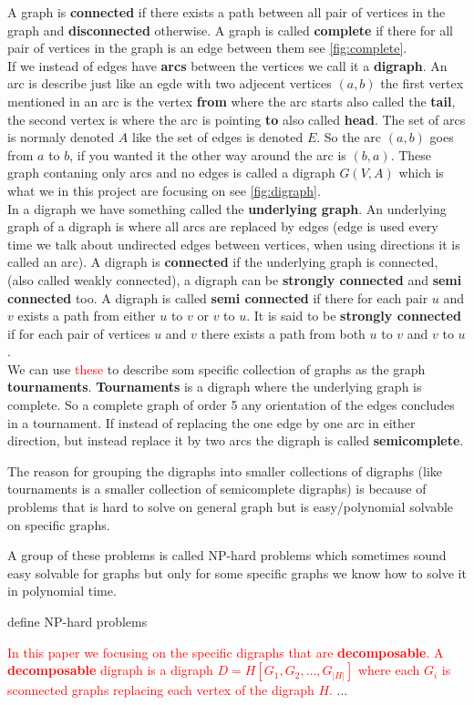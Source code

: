 A graph is \textbf{connected} if there exists a path between all pair of vertices in the graph and \textbf{disconnected} otherwise.
A graph is called \textbf{complete} if there for all pair of vertices in the graph is an edge between them see \autoref{fig:complete}.\\

If we instead of edges have \textbf{arcs} between the vertices we call it a \textbf{digraph}.
An arc is describe just like an egde with two adjecent vertices $(a,b)$ the first vertex mentioned in an arc is the vertex \textbf{from} where the arc starts also called the \textbf{tail}, the second vertex is where the arc is pointing \textbf{to} also called \textbf{head}. The set of arcs is normaly denoted $A$ like the set of edges is denoted $E$. 
So the arc $(a,b)$ goes from $a$ to $b$, if you wanted it the other way around the arc is $(b,a)$.
These graph contaning only arcs and no edges is called a digraph $G(V,A)$ which is what we in this project are focusing on see \autoref{fig:digraph}.\\

In a digraph we have something called the \textbf{underlying graph}. 
An underlying graph of a digraph is where all arcs are replaced by edges (edge is used every time we talk about undirected edges between vertices, when using directions it is called an arc).
A digraph is \textbf{connected} if the underlying graph is connected, (also called weakly connected), a digraph can be \textbf{strongly connected} and \textbf{semi connected} too.
A digraph is called \textbf{semi connected} if there for each pair $u$ and $v$ exists a path from either $u$ to $v$ or $v$ to $u$. 
It is said to be \textbf{strongly connected} if for each pair of vertices $u$ and $v$ there exists a path from both $u$ to $v$ and $v$ to $u$.\\
We can use \textcolor{red}{these} to describe som specific collection of graphs as the graph \textbf{tournaments}.
\textbf{Tournaments} is a digraph where the underlying graph is complete. 
So a complete graph of order 5 any orientation of the edges concludes in a tournament.
If instead of replacing the one edge by one arc in either direction, but instead replace it by two arcs the digraph is called \textbf{semicomplete}.

The reason for grouping the digraphs into smaller collections of digraphs (like tournaments is a smaller collection of semicomplete digraphs) is because of problems that is hard to solve on general graph but is easy/polynomial solvable on specific graphs.

A group of these problems is called NP-hard problems which sometimes sound easy solvable for graphs but only for some specific graphs we know how to solve it in polynomial time. 
\begin{definition}
    define NP-hard problems
\end{definition}

\textcolor{red}{In this paper we focusing on the specific digraphs that are \textbf{decomposable}. 
A \textbf{decomposable} digraph is a digraph $D=H[G_1,G_2,\dots,G_|H|]$ where each $G_i$ is sconnected graphs replacing each vertex of the digraph $H$.} ...
